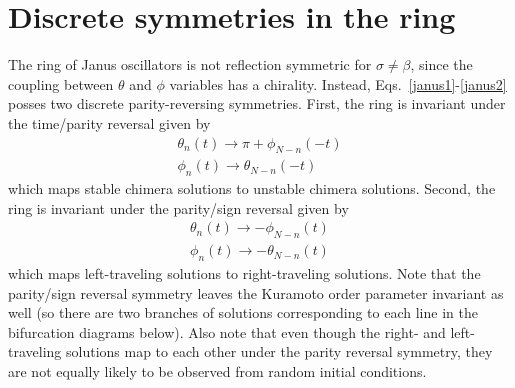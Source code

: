 \documentclass[aps,pre,amsmath,amssymb,floatfix,onecolumn,notitlepage,10pt]{revtex4-1}
\begin{document}
\section{Discrete symmetries in the ring}
The ring of Janus oscillators is not reflection symmetric for $\sigma \neq \beta$, since the coupling between $\theta$ and $\phi$ variables has a chirality. Instead, Eqs.~\eqref{janus1}-\eqref{janus2} posses two discrete parity-reversing symmetries. First, the ring is invariant under the time/parity reversal given by
\begin{align}
\theta_n(t)\to \pi+\phi_{N-n}(-t) \\
\phi_n(t)\to \theta_{N-n}(-t) \label{parity1}
\end{align}
which maps stable chimera solutions to unstable chimera solutions.  Second, the ring is invariant under the parity/sign reversal given by
\begin{align}
\theta_n(t)\to -\phi_{N-n}(t) \\
\phi_n(t)\to -\theta_{N-n}(t) \label{parity2}
\end{align}
which maps left-traveling solutions to right-traveling solutions. Note that the parity/sign reversal symmetry leaves the Kuramoto order parameter invariant as well (so there are two branches of solutions corresponding to each line in the bifurcation diagrams below). Also note that even though the right- and left-traveling solutions map to each other under the parity reversal symmetry, they are not equally likely to be observed from random initial conditions.
\end{document}
